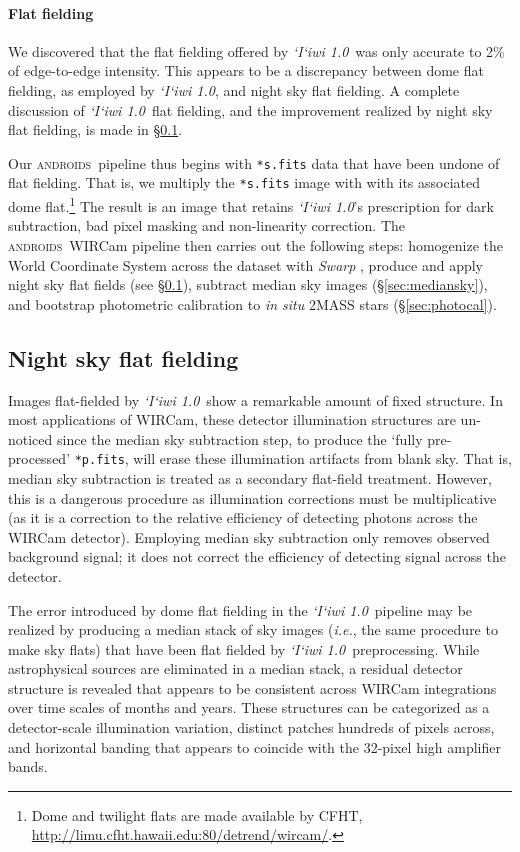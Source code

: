 \documentclass[iop]{emulateapj}
\newcommand{\ie}{\textit{i.e.}}
\newcommand{\sw}[1]{\textit{#1}} %
\newcommand{\iiwione}{\sw{`I`iwi 1.0}}
\newcommand{\androids}{\textsc{androids}}
\begin{document}
\paragraph{Flat fielding} We discovered that the flat fielding offered by \iiwione\ was only accurate to 2\% of edge-to-edge intensity. This appears to be a discrepancy between dome flat fielding, as employed by \iiwione, and night sky flat fielding. A complete discussion of \iiwione\ flat fielding, and the improvement realized by night sky flat fielding, is made in \S \ref{sec:flats}.

\vspace{10pt}

Our \androids\ pipeline thus begins with \texttt{*s.fits} data that have been undone of flat fielding. That is, we multiply the \texttt{*s.fits} image with with its associated dome flat.\footnote{Dome and twilight flats are made available by CFHT, \url{http://limu.cfht.hawaii.edu:80/detrend/wircam/}.} The result is an image that retains \iiwione's prescription for dark subtraction, bad pixel masking and non-linearity correction. The \androids\ WIRCam pipeline then carries out the following steps: homogenize the World Coordinate System across the dataset with \sw{Swarp} \citep{Bertin:2006}, produce and apply night sky flat fields (see \S \ref{sec:flats}), subtract median sky images (\S \ref{sec:mediansky}), and bootstrap photometric calibration to \textit{in situ} 2MASS stars (\S \ref{sec:photocal}).

\subsection{Night sky flat fielding}
\label{sec:flats}

Images flat-fielded by \iiwione\ show a remarkable amount of fixed structure. In most applications of WIRCam, these detector illumination structures are un-noticed since the median sky subtraction step, to produce the `fully pre-processed' \texttt{*p.fits}, will erase these illumination artifacts from blank sky. That is, median sky subtraction is treated as a secondary flat-field treatment. However, this is a dangerous procedure as illumination corrections must be multiplicative (as it is a correction to the relative efficiency of detecting photons across the WIRCam detector). Employing median sky subtraction only removes observed background signal; it does not correct the efficiency of detecting signal across the detector.

The error introduced by dome flat fielding in the \iiwione\ pipeline may be realized by producing a median stack of sky images (\ie, the same procedure to make sky flats) that have been flat fielded by \iiwione\ preprocessing. While astrophysical sources are eliminated in a median stack, a residual detector structure is revealed that appears to be consistent across WIRCam integrations over time scales of months and years. These structures can be categorized as a detector-scale illumination variation, distinct patches hundreds of pixels across, and horizontal banding that appears to coincide with the 32-pixel high amplifier bands.
\end{document}
